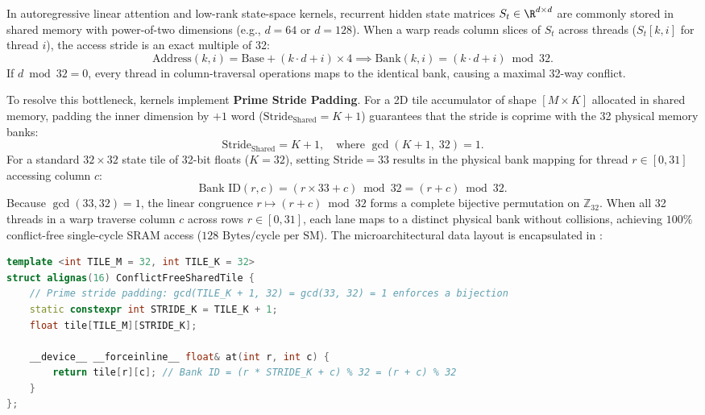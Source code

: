 In autoregressive linear attention and low-rank state-space kernels, recurrent hidden state matrices $S_t \in \R^{d \times d}$ are commonly stored in shared memory with power-of-two dimensions (e.g., $d = 64$ or $d = 128$). When a warp reads column slices of $S_t$ across threads ($S_{t}[k, i]$ for thread $i$), the access stride is an exact multiple of 32:
\begin{equation}
    \text{Address}(k, i) = \text{Base} + (k \cdot d + i) \times 4 \implies \text{Bank}(k, i) = (k \cdot d + i) \bmod 32.
\end{equation}
If $d \bmod 32 = 0$, every thread in column-traversal operations maps to the identical bank, causing a maximal 32-way conflict.

To resolve this bottleneck, \neuralops{} kernels implement \textbf{Prime Stride Padding}. For a 2D tile accumulator of shape $[M \times K]$ allocated in shared memory, padding the inner dimension by $+1$ word ($\text{Stride}_{\text{Shared}} = K + 1$) guarantees that the stride is coprime with the 32 physical memory banks:
\begin{equation}
    \text{Stride}_{\text{Shared}} = K + 1, \quad \text{where } \gcd(K + 1, \; 32) = 1.
\end{equation}
For a standard $32 \times 32$ state tile of 32-bit floats ($K=32$), setting $\text{Stride} = 33$ results in the physical bank mapping for thread $r \in [0, 31]$ accessing column $c$:
\begin{equation}
    \text{Bank ID}(r, c) = (r \times 33 + c) \bmod 32 = (r + c) \bmod 32.
\end{equation}
Because $\gcd(33, 32) = 1$, the linear congruence $r \mapsto (r + c) \bmod 32$ forms a complete bijective permutation on $\mathbb{Z}_{32}$. When all 32 threads in a warp traverse column $c$ across rows $r \in [0, 31]$, each lane maps to a distinct physical bank without collisions, achieving $100\%$ conflict-free single-cycle SRAM access ($128\text{ Bytes/cycle per SM}$). The microarchitectural data layout is encapsulated in :
\begin{lstlisting}[language=C++, caption={\textbf{Bank-Conflict-Free Shared Memory Tile Layout with Prime Stride Padding (\texttt{stride = TILE\_K + 1})}}, label={lst:appendix_cuda_tile}]
template <int TILE_M = 32, int TILE_K = 32>
struct alignas(16) ConflictFreeSharedTile {
    // Prime stride padding: gcd(TILE_K + 1, 32) = gcd(33, 32) = 1 enforces a bijection
    static constexpr int STRIDE_K = TILE_K + 1;
    float tile[TILE_M][STRIDE_K];

    __device__ __forceinline__ float& at(int r, int c) {
        return tile[r][c]; // Bank ID = (r * STRIDE_K + c) % 32 = (r + c) % 32
    }
};
\end{lstlisting}

